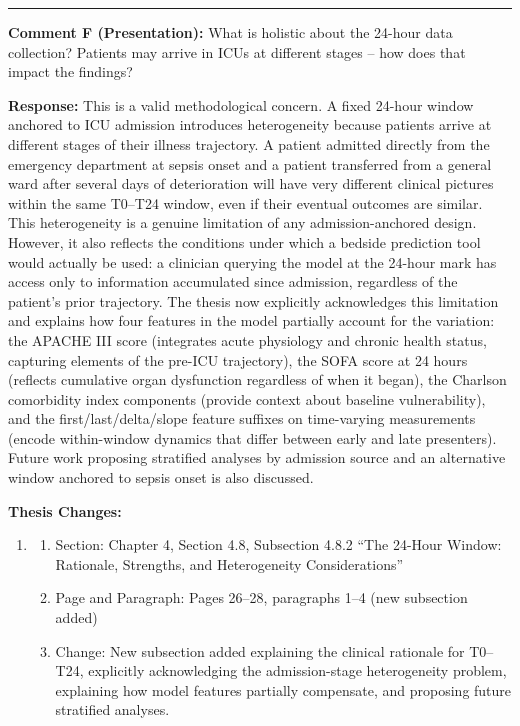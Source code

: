 \documentclass[12pt,a4paper]{article}
\begin{document}
\begin{flushleft}
\vspace{\baselineskip}

\hrule

\vspace{\baselineskip}

\textbf{Comment F (Presentation):} What is holistic about the 24-hour data collection? Patients may arrive in ICUs at different stages -- how does that impact the findings?

\vspace{\baselineskip}

\textbf{Response:} This is a valid methodological concern. A fixed 24-hour window anchored to ICU admission introduces heterogeneity because patients arrive at different stages of their illness trajectory. A patient admitted directly from the emergency department at sepsis onset and a patient transferred from a general ward after several days of deterioration will have very different clinical pictures within the same T0--T24 window, even if their eventual outcomes are similar. This heterogeneity is a genuine limitation of any admission-anchored design. However, it also reflects the conditions under which a bedside prediction tool would actually be used: a clinician querying the model at the 24-hour mark has access only to information accumulated since admission, regardless of the patient's prior trajectory. The thesis now explicitly acknowledges this limitation and explains how four features in the model partially account for the variation: the APACHE III score (integrates acute physiology and chronic health status, capturing elements of the pre-ICU trajectory), the SOFA score at 24 hours (reflects cumulative organ dysfunction regardless of when it began), the Charlson comorbidity index components (provide context about baseline vulnerability), and the first/last/delta/slope feature suffixes on time-varying measurements (encode within-window dynamics that differ between early and late presenters). Future work proposing stratified analyses by admission source and an alternative window anchored to sepsis onset is also discussed.

\vspace{\baselineskip}

\textbf{Thesis Changes:}
\begin{enumerate}
    \item
    \begin{enumerate}
        \item Section: Chapter 4, Section 4.8, Subsection 4.8.2 ``The 24-Hour Window: Rationale, Strengths, and Heterogeneity Considerations''
        \item Page and Paragraph: Pages 26--28, paragraphs 1--4 (new subsection added)
        \item Change: New subsection added explaining the clinical rationale for T0--T24, explicitly acknowledging the admission-stage heterogeneity problem, explaining how model features partially compensate, and proposing future stratified analyses.
    \end{enumerate}
\end{enumerate}


\end{flushleft}
\end{document}
